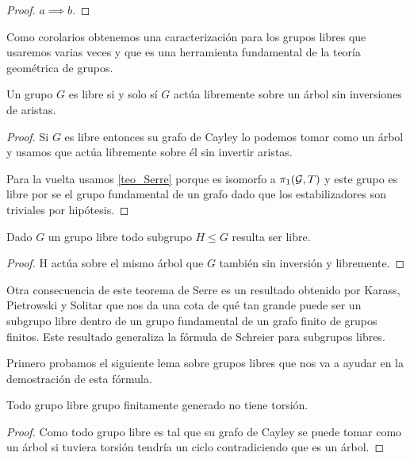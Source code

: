 \documentclass[tesis.tex]{subfiles}
\newcommand{\fg}{grupo finitamente generado }
\newcommand{\cG}{ {\cal G} }
\begin{document}
\begin{proof}	
		 \textbf{$a \implies b$}.
\end{proof}

Como corolarios obtenemos una caracterización para los grupos libres que usaremos varias veces y que es una herramienta fundamental de la teoría geométrica de grupos.

\begin{coro}
	Un grupo $G$ es libre si y solo sí $G$ actúa libremente sobre un árbol sin inversiones de aristas. 
\end{coro}
\begin{proof}
	Si $G$ es libre entonces su grafo de Cayley lo podemos tomar como un árbol y usamos que actúa libremente sobre él sin invertir aristas.
	
	Para la vuelta usamos \ref{teo_Serre} porque es isomorfo a $\pi_1(\cG, T)$ y este grupo es libre por se el grupo fundamental de un grafo dado que los estabilizadores son triviales por hipótesis.
\end{proof}

\begin{coro}
	Dado $G$ un grupo libre todo subgrupo $H \le G$ resulta ser libre.
\end{coro}
\begin{proof}
	H actúa sobre el mismo árbol que $G$ también sin inversión y libremente.
\end{proof}

Otra consecuencia de este teorema de Serre es un resultado obtenido por Karass, Pietrowski y Solitar que nos da una cota de qué tan grande puede ser un subgrupo libre dentro de un grupo fundamental de un grafo finito de grupos finitos.
Este resultado generaliza la fórmula de Schreier para subgrupos libres.


Primero probamos el siguiente lema sobre grupos libres que nos va a ayudar en la demostración de esta fórmula.

\begin{lema}\label{lema_libre_torsion}
	Todo grupo libre \fg no tiene torsión.
\end{lema}
\begin{proof}
	Como todo grupo libre es tal que su grafo de Cayley se puede tomar como un árbol si tuviera torsión tendría un ciclo contradiciendo que es un árbol.
\end{proof}
\end{document}
